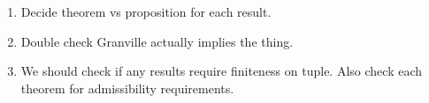 \documentclass[11pt, leqno]{article}
\newcommand{\Res}{\text{Res}}
\begin{document}







\begin{enumerate}
    \item 
        Decide theorem vs proposition for each result.

    \item
        Double check Granville actually implies the thing.

    \item 
        We should check if any results require finiteness on tuple.
        Also check each theorem for admissibility requirements.
\end{enumerate}

\pagebreak
\printbibliography
\end{document}
